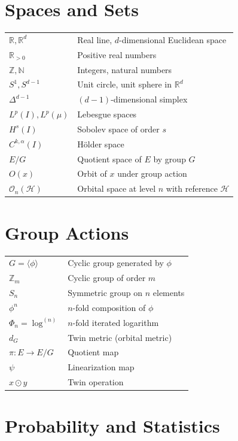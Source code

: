 \documentclass[11pt,twoside,openright]{book}
\theoremstyle{plain}
\theoremstyle{definition}
\theoremstyle{remark}
\newcommand{\calH}{\mathcal{H}}
\newcommand{\calO}{\mathcal{O}}
\newcommand{\Rd}{\mathbb{R}}
\newcommand{\Nd}{\mathbb{N}}
\newcommand{\Zd}{\mathbb{Z}}
\newcommand{\twin}{\odot}
\begin{document}
\section*{Spaces and Sets}

\begin{tabular}{ll}
$\Rd, \Rd^d$ & Real line, $d$-dimensional Euclidean space\\
$\Rd_{>0}$ & Positive real numbers\\
$\Zd, \Nd$ & Integers, natural numbers\\
$S^1, S^{d-1}$ & Unit circle, unit sphere in $\Rd^d$\\
$\Delta^{d-1}$ & $(d-1)$-dimensional simplex\\
$L^p(I), L^p(\mu)$ & Lebesgue spaces\\
$H^s(I)$ & Sobolev space of order $s$\\
$C^{k,\alpha}(I)$ & Hölder space\\
$E/G$ & Quotient space of $E$ by group $G$\\
$O(x)$ & Orbit of $x$ under group action\\
$\calO_n(\calH)$ & Orbital space at level $n$ with reference $\calH$\\
\end{tabular}

\section*{Group Actions}

\begin{tabular}{ll}
$G = \langle \phi \rangle$ & Cyclic group generated by $\phi$\\
$\Zd_m$ & Cyclic group of order $m$\\
$S_n$ & Symmetric group on $n$ elements\\
$\phi^n$ & $n$-fold composition of $\phi$\\
$\Phi_n = \log^{(n)}$ & $n$-fold iterated logarithm\\
$d_G$ & Twin metric (orbital metric)\\
$\pi : E \to E/G$ & Quotient map\\
$\psi$ & Linearization map\\
$x \twin y$ & Twin operation\\
\end{tabular}

\section*{Probability and Statistics}
\end{document}
